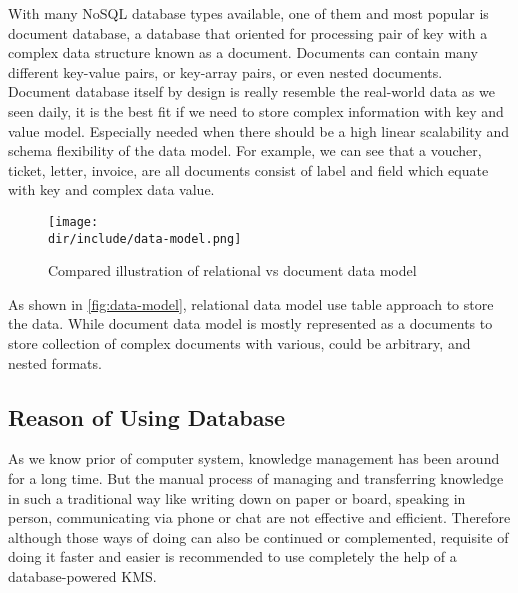 With many \ac{NoSQL} database types available, one of them and most popular is document database, a database that oriented for processing pair of  key with a complex data structure known as a document.
Documents can contain many different key-value pairs, or key-array pairs, or even nested documents.~\autocite{MongoDB:2015:NoSQL}
Document database itself by design is really resemble the real-world data as we seen daily, it is the best fit if we need to store complex information with key and value model.
Especially needed when there should be a high linear scalability and schema flexibility of the data model.
For example, we can see that a voucher, ticket, letter, invoice, are all documents consist of label and field which equate with key and complex data value.

\begin{figure}[htbp]
    \centering
    \texttt{[image: \\dir/include/data-model.png]}
    \caption[Relational vs Document Data Model]{Compared illustration of relational vs document data model}
    \label{fig:data-model}
\end{figure}

As shown in \autoref{fig:data-model}, relational data model use table approach to store the data.
While document data model is mostly represented as a documents to store collection of complex documents with various, could be arbitrary, and nested formats.

\subsection{Reason of Using Database}
\label{ssec:reason-db}

As we know prior of computer system, knowledge management has been around for a long time.
But the manual process of managing and transferring knowledge in such a traditional way like writing down on paper or board, speaking in person, communicating via phone or chat are not effective and efficient.
Therefore although those ways of doing can also be continued or complemented, requisite of doing it faster and easier is recommended to use completely the help of a database-powered \ac{KMS}.
